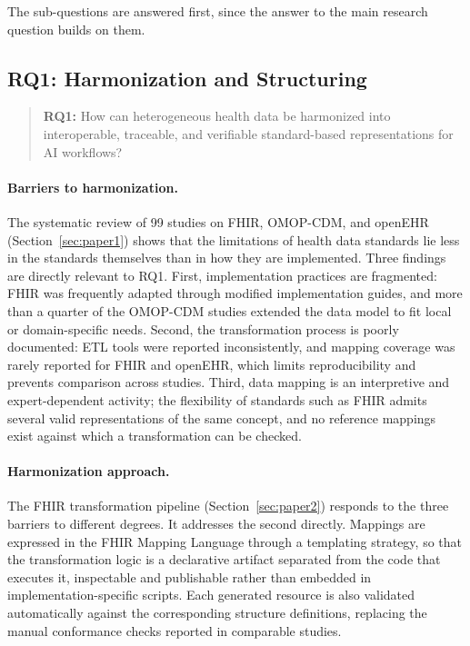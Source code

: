 The sub-questions are answered first, since the answer to the main research question builds on them.

\subsection{RQ1: Harmonization and Structuring}
\label{subsec:conclusions_rq1}

\begin{quote}
\textbf{RQ1:} How can heterogeneous health data be harmonized into interoperable, traceable, and verifiable standard-based representations for AI workflows?
\end{quote}

\paragraph{Barriers to harmonization.}
The systematic review of 99 studies on FHIR, OMOP-CDM, and openEHR (Section~\ref{sec:paper1}) shows that the limitations of health data standards lie less in the standards themselves than in how they are implemented. Three findings are directly relevant to RQ1. First, implementation practices are fragmented: FHIR was frequently adapted through modified implementation guides, and more than a quarter of the OMOP-CDM studies extended the data model to fit local or domain-specific needs. Second, the transformation process is poorly documented: ETL tools were reported inconsistently, and mapping coverage was rarely reported for FHIR and openEHR, which limits reproducibility and prevents comparison across studies. Third, data mapping is an interpretive and expert-dependent activity; the flexibility of standards such as FHIR admits several valid representations of the same concept, and no reference mappings exist against which a transformation can be checked.

\paragraph{Harmonization approach.}
The FHIR transformation pipeline (Section~\ref{sec:paper2}) responds to the three barriers to different degrees. It addresses the second directly. Mappings are expressed in the FHIR Mapping Language through a templating strategy, so that the transformation logic is a declarative artifact separated from the code that executes it, inspectable and publishable rather than embedded in implementation-specific scripts. Each generated resource is also validated automatically against the corresponding structure definitions, replacing the manual conformance checks reported in comparable studies.

